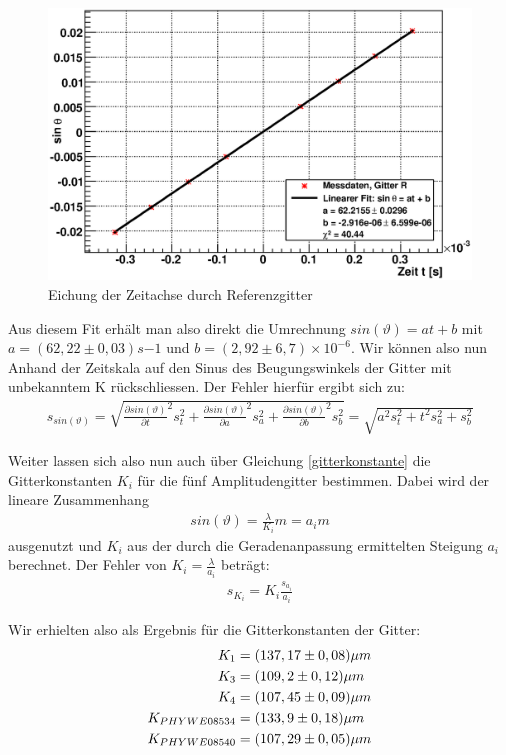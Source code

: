 \documentclass[12pt]{article}
\begin{document}
\begin{figure}[H]  
\centering
\includegraphics[width=0.7\linewidth]{pictures/r.eps}
\caption{Eichung der Zeitachse durch Referenzgitter}
\end{figure}

Aus diesem Fit erhält man also direkt die Umrechnung $sin(\vartheta)=at+b$ mit $a=(62,22\pm 0,03)s{-1}$ und $b=(2,92\pm 6,7)\times 10^{-6}$. Wir können also nun Anhand der Zeitskala auf den Sinus des Beugungswinkels der Gitter mit unbekanntem K rückschliessen. Der Fehler hierfür ergibt sich zu:
\begin{align}
 s_{sin(\vartheta)} = \sqrt{\frac{\partial sin(\vartheta)}{\partial t}^2s_t^2 + \frac{\partial sin(\vartheta)}{\partial a}^2s_a^2 + \frac{\partial sin(\vartheta)}{\partial b}^2s_b^2} = \sqrt{a^2s_t^2+t^2s_a^2+s_b^2}
\end{align}

Weiter lassen sich also nun auch über Gleichung \ref{gitterkonstante} die Gitterkonstanten $K_i$ für die fünf Amplitudengitter bestimmen. Dabei wird der lineare Zusammenhang 
\begin{align}
 sin(\vartheta) = \frac{\lambda}{K_i}m = a_im
\end{align}
ausgenutzt und $K_i$ aus der durch die Geradenanpassung ermittelten Steigung $a_i$ berechnet. Der Fehler von $K_i = \frac{\lambda}{a_i}$ beträgt:
\begin{align}
 s_{K_i}=K_i\frac{s_{a_i}}{a_i}
\end{align}

Wir erhielten also als Ergebnis für die Gitterkonstanten der Gitter:
\begin{align}
 \notag
K_1 &= ( 137,17 \pm 0,08)\mu m \\
 \notag
K_3 &= ( 109,2\pm 0,12)\mu m \\
 \notag
K_4 &= ( 107,45\pm 0,09)\mu m \\
 \notag
K_{PHYWE08534} &= ( 133,9 \pm 0,18)\mu m \\
 \notag
K_{PHYWE08540} &= ( 107,29 \pm 0,05)\mu m
\end{align}
\end{document}
